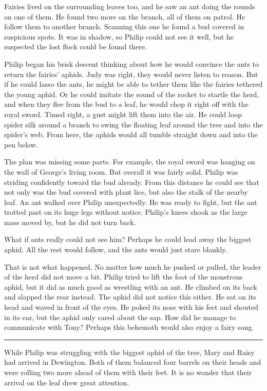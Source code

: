 \documentclass[10pt, draft]{memoir}
\renewcommand{\pfbreakdisplay}{\bigskip \ding{166} \bigskip}
\newcommand{\secbreak}{\fancybreak{\pfbreakdisplay}}
\begin{document}
Fairies lived on the surrounding leaves too, and he saw an ant doing the rounds on one of them. He found two more on the branch, all of them on patrol. He follow them to another branch. Scanning this one he found a bud covered in suspicious spots. It was in shadow, so Philip could not see it well, but he suspected the lost flock could be found there.

Philip began his brisk descent thinking about how he would convince the ants to return the fairies' aphids. Judy was right, they would never listen to reason. But if he could lasso the ants, he might be able to tether them like the fairies tethered the young aphid. Or he could imitate the sound of the rocket to startle the herd, and when they flee from the bud to a leaf, he would chop it right off with the royal sword. Timed right, a gust might lift them into the air. He could loop spider silk around a branch to swing the floating leaf around the tree and into the spider's web. From here, the aphids would all tumble straight down and into the pen below.

The plan was missing some parts. For example, the royal sword was hanging on the wall of George's living room. But overall it was fairly solid. Philip was striding confidently toward the bud already. From this distance he could see that not only was the bud covered with plant lice, but also the stalk of the nearby leaf. An ant walked over Philip unexpectedly. He was ready to fight, but the ant trotted past on its huge legs without notice. Philip's knees shook as the large mass moved by, but he did not turn back.

What if ants really could not see him? Perhaps he could lead away the biggest aphid. All the rest would follow, and the ants would just stare blankly.

That is not what happened. No matter how much he pushed or pulled, the leader of the herd did not move a bit. Philip tried to lift the foot of the monstrous aphid, but it did as much good as wrestling with an ant. He climbed on its back and slapped the rear instead. The aphid did not notice this either. He sat on its head and waved in front of the eyes. He poked its nose with his feet and shouted in its ear, but the aphid only cared about the sap. How did he manage to communicate with Tony? Perhaps this behemoth would also enjoy a fairy song.

\secbreak

While Philip was struggling with the biggest aphid of the tree, Mary and Raisy had arrived in  Dewington. Both of them balanced four barrels on their heads and were rolling two more ahead of them with their feet. It is no wonder that their arrival on the leaf drew great attention.
\end{document}
